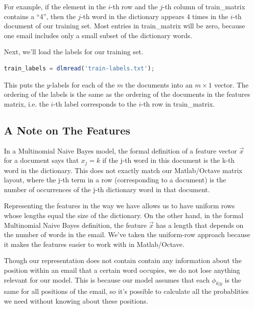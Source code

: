 \documentclass[10pt,a4paper]{article}
\begin{document}
  For example, if the element in the $i$-th row and the $j$-th column of train\_matrix contains a ``4'', then the $j$-th word in the dictionary appears 4 times in the $i$-th document of our training set. Most entries in train\_matrix will be zero, because one email includes only a small subset of the dictionary words.

  Next, we'll load the labels for our training set.
  \begin{lstlisting}[language=Octave, basicstyle=\footnotesize, showspaces=false]
    train_labels = dlmread('train-labels.txt');
  \end{lstlisting}
  This puts the $y$-labels for each of the $m$ the documents into an $m \times 1$ vector. The ordering of the labels is the same as the ordering of the documents in the features matrix, i.e. the $i$-th label corresponds to the $i$-th row in train\_matrix.



  \subsection{A Note on The Features}
  In a Multinomial Naive Bayes model, the formal definition of a feature vector $\vec{x}$ for a document says that $x_j = k$ if the j-th word in this document is the k-th word in the dictionary. This does not exactly match our Matlab/Octave matrix layout, where the j-th term in a row (corresponding to a document) is the number of occurrences of the j-th dictionary word in that document.

  Representing the features in the way we have allows us to have uniform rows whose lengths equal the size of the dictionary. On the other hand, in the formal Multinomial Naive Bayes definition, the feature  $\vec{x}$ has a length that depends on the number of words in the email. We've taken the uniform-row approach because it makes the features easier to work with in Matlab/Octave.

  Though our representation does not contain contain any information about the position within an email that a certain word occupies, we do not lose anything relevant for our model. This is because our model assumes that each $\phi_{k\vert y}$ is the same for all positions of the email, so it's possible to calculate all the probablities we need without knowing about these positions.
\end{document}
